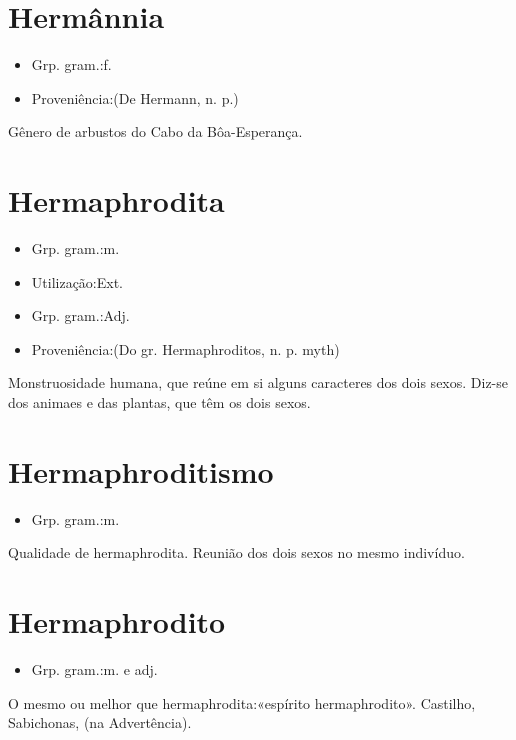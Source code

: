\documentclass{article}
\begin{document}
\section{Hermânnia}
\begin{itemize}
\item {Grp. gram.:f.}
\end{itemize}
\begin{itemize}
\item {Proveniência:(De \textunderscore Hermann\textunderscore , n. p.)}
\end{itemize}
Gênero de arbustos do Cabo da Bôa-Esperança.
\section{Hermaphrodita}
\begin{itemize}
\item {Grp. gram.:m.}
\end{itemize}
\begin{itemize}
\item {Utilização:Ext.}
\end{itemize}
\begin{itemize}
\item {Grp. gram.:Adj.}
\end{itemize}
\begin{itemize}
\item {Proveniência:(Do gr. \textunderscore Hermaphroditos\textunderscore , n. p. myth)}
\end{itemize}
Monstruosidade humana, que reúne em si alguns caracteres dos dois sexos.
Diz-se dos animaes e das plantas, que têm os dois sexos.
\section{Hermaphroditismo}
\begin{itemize}
\item {Grp. gram.:m.}
\end{itemize}
Qualidade de hermaphrodita.
Reunião dos dois sexos no mesmo indivíduo.
\section{Hermaphrodito}
\begin{itemize}
\item {Grp. gram.:m.  e  adj.}
\end{itemize}
O mesmo ou melhor que \textunderscore hermaphrodita\textunderscore :«\textunderscore espírito hermaphrodito\textunderscore ». Castilho, \textunderscore Sabichonas\textunderscore , (na Advertência).
\end{document}
